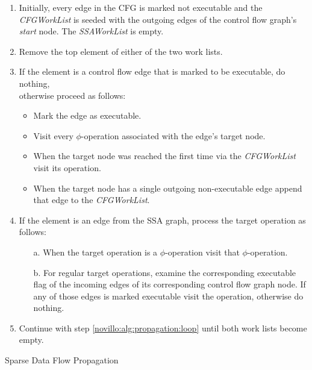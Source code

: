 \begin{algorithm}[t!]
  \begin{enumerate}
    \item Initially, every edge in the CFG is marked not executable and the
          \emph{CFGWorkList} is seeded with the outgoing edges of the control
          flow graph's \emph{start} node.  The \emph{SSAWorkList} is empty.
    \item \label{novillo:alg:propagation:loop} Remove the top element of either
          of the two work lists.
    \item \label{novillo:alg:propagation:flowedge} If the element is a control
          flow edge that is marked to be executable, do nothing, \\
          otherwise proceed as follows:
          \begin{itemize}
            \vspace{-1.2ex}
            \item Mark the edge as executable.
            \item Visit every $\phi$-operation associated with the edge's target
                  node.
            \item When the target node was reached the first time via the
                  \emph{CFGWorkList} visit its operation.
            \item When the target node has a single outgoing non-executable edge
                  append that edge to the \emph{CFGWorkList}.
          \end{itemize}
          \vspace{-1ex}
    \item \label{novillo:alg:propagation:ssaedge} If the element is an edge from
          the SSA graph, process the target operation as follows:
          \begin{enumerate}
            \vspace{-1.2ex}
            \item[a.] When the target operation is a $\phi$-operation visit that
                      $\phi$-operation.
            \item[b.] \label{novillo:alg:propagation:ssaedge:regular} For
                      regular target operations, examine the corresponding
                      executable flag of the incoming edges of its corresponding
                      control flow graph node. If any of those edges is marked
                      executable visit the operation, otherwise do nothing.
          \end{enumerate}
          \vspace{-1ex}
    \item Continue with step \ref{novillo:alg:propagation:loop} until both work
          lists become empty.
  \end{enumerate}

  \caption{Sparse Data Flow Propagation}
  \label{alg:constant_propagation_is_easier:propagation}
\end{algorithm}

